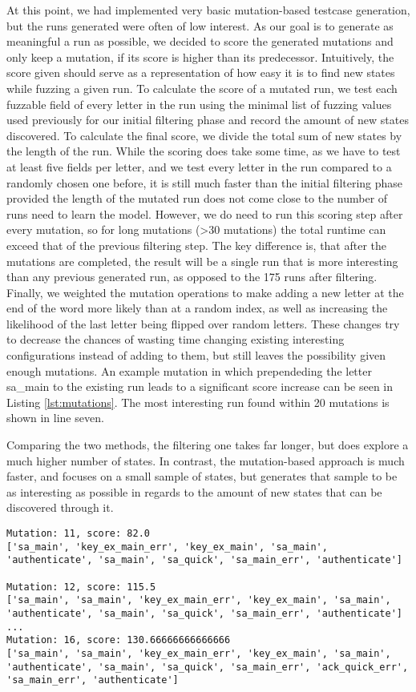 At this point, we had implemented very basic mutation-based testcase generation, but the runs generated were often of low interest. As our goal is to generate as meaningful a run as possible, we decided to score the generated mutations and only keep a mutation, if its score is higher than its predecessor. Intuitively, the score given should serve as a representation of how easy it is to find new states while fuzzing a given run. To calculate the score of a mutated run, we test each fuzzable field of every letter in the run using the minimal list of fuzzing values used previously for our initial filtering phase and record the amount of new states discovered. To calculate the final score, we divide the total sum of new states by the length of the run. While the scoring does take some time, as we have to test at least five fields per letter, and we test every letter in the run compared to a randomly chosen one before, it is still much faster than the initial filtering phase provided the length of the mutated run does not come close to the number of runs need to learn the model. However, we do need to run this scoring step after every mutation, so for long mutations (>30 mutations) the total runtime can exceed that of the previous filtering step. The key difference is, that after the mutations are completed, the result will be a single run that is more interesting than any previous generated run, as opposed to the 175 runs after filtering. Finally, we weighted the mutation operations to make adding a new letter at the end of the word more likely than at a random index, as well as increasing the likelihood of the last letter being flipped over random letters. These changes try to decrease the chances of wasting time changing existing interesting configurations instead of adding to them, but still leaves the possibility given enough mutations. An example mutation in which prependeding the letter sa\_main to the existing run leads to a significant score increase can be seen in Listing \ref{lst:mutations}. The most interesting run found within 20 mutations is shown in line seven.

Comparing the two methods, the filtering one takes far longer, but does explore a much higher number of states. In contrast, the mutation-based approach is much faster, and focuses on a small sample of states, but generates that sample to be as interesting as possible in regards to the amount of new states that can be discovered through it.


\begin{lstlisting}[float=h, caption=Mutations, label=lst:mutations]
Mutation: 11, score: 82.0
['sa_main', 'key_ex_main_err', 'key_ex_main', 'sa_main', 'authenticate', 'sa_main', 'sa_quick', 'sa_main_err', 'authenticate']

Mutation: 12, score: 115.5
['sa_main', 'sa_main', 'key_ex_main_err', 'key_ex_main', 'sa_main', 'authenticate', 'sa_main', 'sa_quick', 'sa_main_err', 'authenticate']
...
Mutation: 16, score: 130.66666666666666
['sa_main', 'sa_main', 'key_ex_main_err', 'key_ex_main', 'sa_main', 'authenticate', 'sa_main', 'sa_quick', 'sa_main_err', 'ack_quick_err', 'sa_main_err', 'authenticate']
\end{lstlisting}
